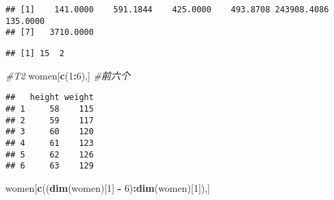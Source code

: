 \documentclass[
]{article}
\newenvironment{Shaded}{\begin{snugshade}}{\end{snugshade}}
\newcommand{\AttributeTok}[1]{\textcolor[rgb]{0.13,0.29,0.53}{#1}}
\newcommand{\CommentTok}[1]{\textcolor[rgb]{0.56,0.35,0.01}{\textit{#1}}}
\newcommand{\DecValTok}[1]{\textcolor[rgb]{0.00,0.00,0.81}{#1}}
\newcommand{\FloatTok}[1]{\textcolor[rgb]{0.00,0.00,0.81}{#1}}
\newcommand{\FunctionTok}[1]{\textcolor[rgb]{0.13,0.29,0.53}{\textbf{#1}}}
\newcommand{\NormalTok}[1]{#1}
\newcommand{\OtherTok}[1]{\textcolor[rgb]{0.56,0.35,0.01}{#1}}
\newcommand{\SpecialCharTok}[1]{\textcolor[rgb]{0.81,0.36,0.00}{\textbf{#1}}}
\newcommand{\StringTok}[1]{\textcolor[rgb]{0.31,0.60,0.02}{#1}}
\begin{document}
\begin{verbatim}
## [1]    141.0000    591.1844    425.0000    493.8708 243908.4086    135.0000
## [7]   3710.0000
\end{verbatim}

\begin{Shaded}
\end{Shaded}

\begin{verbatim}
## [1] 15  2
\end{verbatim}

\begin{Shaded}
\begin{Highlighting}[]
\CommentTok{\#T2}
\NormalTok{women[}\FunctionTok{c}\NormalTok{(}\DecValTok{1}\SpecialCharTok{:}\DecValTok{6}\NormalTok{),] }\CommentTok{\#前六个}
\end{Highlighting}
\end{Shaded}

\begin{verbatim}
##   height weight
## 1     58    115
## 2     59    117
## 3     60    120
## 4     61    123
## 5     62    126
## 6     63    129
\end{verbatim}

\begin{Shaded}
\begin{Highlighting}[]
\NormalTok{women[}\FunctionTok{c}\NormalTok{((}\FunctionTok{dim}\NormalTok{(women)[}\DecValTok{1}\NormalTok{] }\SpecialCharTok{{-}} \DecValTok{6}\NormalTok{)}\SpecialCharTok{:}\FunctionTok{dim}\NormalTok{(women)[}\DecValTok{1}\NormalTok{]),]}
\end{Highlighting}
\end{Shaded}
\end{document}
